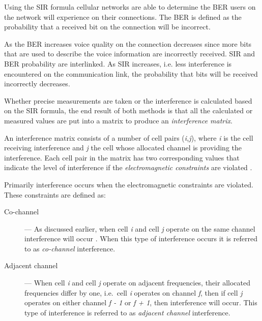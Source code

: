 Using the \gls{SIR} formula cellular networks are able to determine the \gls{BER} users on the network will experience on their connections\cite{WirelessDigitalCommunications}. The \gls{BER} is defined as the probability that a received bit on the connection will be incorrect\cite{MobileWirelessCommunications}. 

As the \gls{BER} increases voice quality on the connection decreases since more bits that are used to describe the voice information are incorrectly received\cite{WirelessDigitalCommunications}. \gls{SIR} and \gls{BER} probability are interlinked. As \gls{SIR} increases, i.e. less interference is encountered on the communication link, the probability that bits will be received incorrectly decreases\cite{WirelessDigitalCommunications}.

Whether precise measurements are taken or the interference is calculated based on the \gls{SIR} formula, the end result of both methods is that all the calculated or measured values are put into a matrix to produce an \emph{interference matrix}\cite{ACOvsEA}.

An interference matrix consists of a number of cell pairs (\emph{i,j}), where \emph{i} is the cell receiving interference and \emph{j} the cell whose allocated channel is providing the interference\cite{Karen2004}. Each cell pair in the matrix has two corresponding values that indicate the level of interference if the \emph{electromagnetic constraints} are violated \cite{ACOvsEA,AndreasPaper}. 

Primarily interference occurs when the electromagnetic constraints are violated. These constraints are defined as:
\begin{description}
\item[Co-channel] --- As discussed earlier, when cell \emph{i} and cell \emph{j} operate on the same channel interference will occur \cite{GSMSysEngin,PrinciplesMobileCommunication}. When this type of interference occurs it is referred to as \emph{co-channel} interference.
\item[Adjacent channel] --- When cell \emph{i} and cell \emph{j} operate on adjacent frequencies, their allocated frequencies differ by one, i.e.\ cell \emph{i} operates on channel \emph{f}, then if cell \emph{j} operates on either channel \emph{f - 1} or \emph{f + 1}, then interference will occur\cite{GSMSysEngin,InterferenceOrientatedFAP}. This type of interference is referred to as \emph{adjacent channel} interference.
\end{description}

